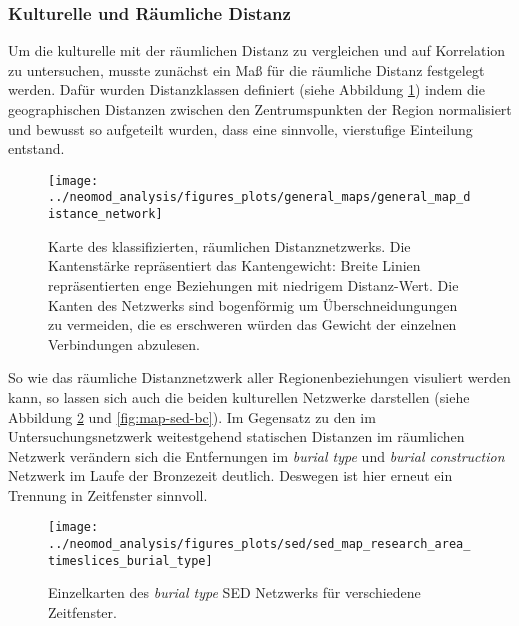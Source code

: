 \documentclass[openany,twoside,twocolumn]{book}
\begin{document}
\hypertarget{kulturelle-und-raumliche-distanz-1}{%
\subsubsection{Kulturelle und Räumliche
Distanz}\label{kulturelle-und-raumliche-distanz-1}}

Um die kulturelle mit der räumlichen Distanz zu vergleichen und auf
Korrelation zu untersuchen, musste zunächst ein Maß für die räumliche
Distanz festgelegt werden. Dafür wurden Distanzklassen definiert (siehe
Abbildung \ref{fig:map-regions-distance-classes}) indem die
geographischen Distanzen zwischen den Zentrumspunkten der Region
normalisiert und bewusst so aufgeteilt wurden, dass eine sinnvolle,
vierstufige Einteilung entstand.

\begin{figure}
\texttt{[image: ../neomod\_analysis/figures\_plots/general\_maps/general\_map\_distance\_network]} \caption[Karte des klassifizierten, räumlichen Distanznetzwerks]{Karte des klassifizierten, räumlichen Distanznetzwerks. Die Kantenstärke repräsentiert das Kantengewicht: Breite Linien repräsentierten enge Beziehungen mit niedrigem Distanz-Wert. Die Kanten des Netzwerks sind bogenförmig um Überschneidungungen zu vermeiden, die es erschweren würden das Gewicht der einzelnen Verbindungen abzulesen.}\label{fig:map-regions-distance-classes}
\end{figure}

So wie das räumliche Distanznetzwerk aller Regionenbeziehungen visuliert
werden kann, so lassen sich auch die beiden kulturellen Netzwerke
darstellen (siehe Abbildung \ref{fig:map-sed-bt} und
\ref{fig:map-sed-bc}). Im Gegensatz zu den im Untersuchungsnetzwerk
weitestgehend statischen Distanzen im räumlichen Netzwerk verändern sich
die Entfernungen im \emph{burial type} und \emph{burial construction}
Netzwerk im Laufe der Bronzezeit deutlich. Deswegen ist hier erneut ein
Trennung in Zeitfenster sinnvoll.

\begin{landscape}
\begin{figure}
\texttt{[image: ../neomod\_analysis/figures\_plots/sed/sed\_map\_research\_area\_timeslices\_burial\_type]} \caption[Einzelkarten des \textit{burial type} SED Netzwerks für verschiedene Zeitfenster]{Einzelkarten des \textit{burial type} SED Netzwerks für verschiedene Zeitfenster.}\label{fig:map-sed-bt}
\end{figure}
\end{landscape}
\end{document}
